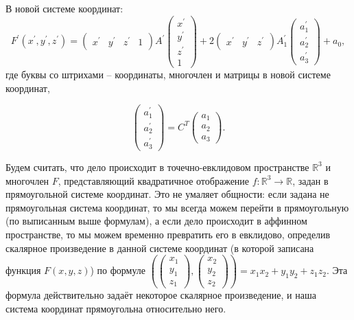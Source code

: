 \documentclass[a4paper, 12pt]{article}
\theoremstyle{definition}
\begin{document}
В новой системе координат:
\[ F^{'}(x^{'},y^{'},z^{'}) = \begin{pmatrix}
    x^{'} & y^{'} & z^{'} & 1
\end{pmatrix}
A^{'}
\begin{pmatrix}
    x^{'} \\ y^{'} \\ z^{'} \\ 1
\end{pmatrix}
+ 2 \begin{pmatrix}
    x^{'} & y^{'} & z^{'}
\end{pmatrix}
A_1^{'}
\begin{pmatrix}
    a_1^{'} \\ a_2^{'} \\ a_3^{'}
\end{pmatrix} 
+ a_0,
\]
где буквы со штрихами – координаты, многочлен и матрицы в новой системе координат,

\[
\begin{pmatrix}
    a_1^{'} \\ a_2^{'} \\ a_3^{'}
\end{pmatrix} = C^T 
\begin{pmatrix}
    a_1 \\ a_2 \\ a_3
\end{pmatrix}.
\]

Будем считать, что дело происходит в точечно-евклидовом пространстве $\mathbb{R}^3$ и многочлен $F$, представляющий квадратичное отображение $f: \mathbb{R}^3 \to \mathbb{R}$, задан в прямоугольной системе координат. Это не умаляет общности: если задана не прямоугольная система координат, то мы всегда можем перейти в прямоугольную (по выписанным выше формулам), а если дело происходит в аффинном пространстве, то мы можем временно превратить его в евклидово, определив скалярное произведение в данной системе координат (в которой записана функция $F(x,y,z)$) по формуле $\left(
     \begin{pmatrix}
        x_1 \\ y_1 \\ z_1
     \end{pmatrix},
     \begin{pmatrix}
        x_2 \\ y_2 \\ z_2
     \end{pmatrix}
\right)
= x_1 x_2 + y_1 y_2 + z_1 z_2$.
Эта формула действительно задаёт некоторое скалярное произведение, и наша система координат прямоугольна относительно него.
\end{document}
